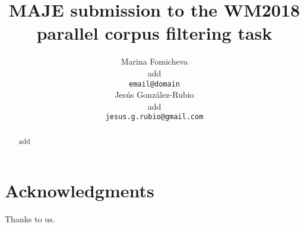 \documentclass[11pt,a4paper]{article}
\title{MAJE submission to the WM2018 parallel corpus filtering task}
\author{Marina Fomicheva \\
  add \\
  {\tt email@domain} \\\And
  Jes\'us Gonz\'alez-Rubio \\
  add\\
  {\tt jesus.g.rubio@gmail.com} \\}
\date{}
\begin{document}
\maketitle
\begin{abstract}
  add
\end{abstract}








\section*{Acknowledgments}
Thanks to us.





\end{document}
